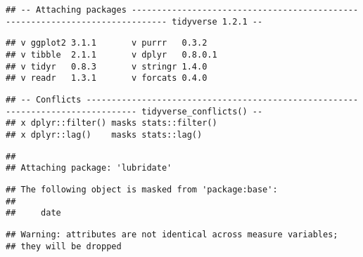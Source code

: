 \documentclass[]{article}
\title{}
\author{Eric Book}
\date{}
\begin{document}
\begin{verbatim}
## -- Attaching packages ----------------------------------------------------------------------------- tidyverse 1.2.1 --
\end{verbatim}

\begin{verbatim}
## v ggplot2 3.1.1       v purrr   0.3.2  
## v tibble  2.1.1       v dplyr   0.8.0.1
## v tidyr   0.8.3       v stringr 1.4.0  
## v readr   1.3.1       v forcats 0.4.0
\end{verbatim}

\begin{verbatim}
## -- Conflicts -------------------------------------------------------------------------------- tidyverse_conflicts() --
## x dplyr::filter() masks stats::filter()
## x dplyr::lag()    masks stats::lag()
\end{verbatim}

\begin{verbatim}
## 
## Attaching package: 'lubridate'
\end{verbatim}

\begin{verbatim}
## The following object is masked from 'package:base':
## 
##     date
\end{verbatim}

\begin{verbatim}
## Warning: attributes are not identical across measure variables;
## they will be dropped
\end{verbatim}
\end{document}
